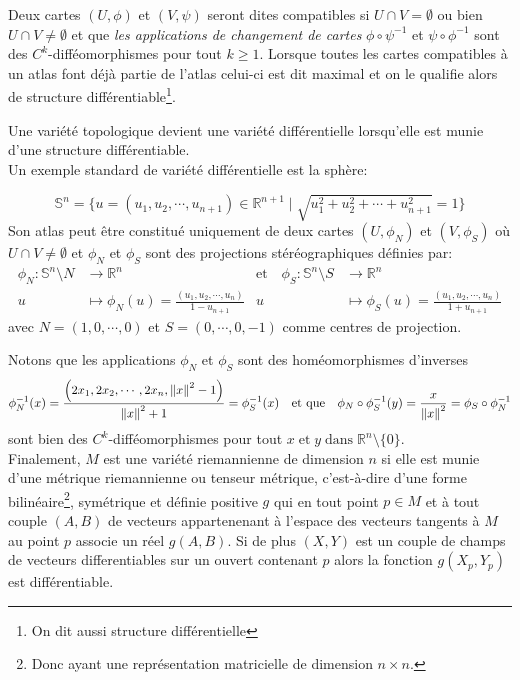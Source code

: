 \documentclass[11pt,french]{article}
\begin{document}
Deux cartes $(U, \phi)$ et $(V, \psi)$ seront dites compatibles si $U \cap V=\emptyset$ ou bien $U\cap V\neq \emptyset$ et que \textit{les applications de changement de cartes} $\phi\circ\psi^{-1}$ et $\psi\circ\phi^{-1}$ sont des $C^{k}$-difféomorphismes pour tout $k\geq 1$. Lorsque toutes les cartes compatibles à un atlas font déjà partie de l'atlas celui-ci est dit maximal et on le qualifie alors de structure différentiable\footnote{On dit aussi structure différentielle}.

Une variété topologique devient une variété différentielle lorsqu'elle est munie d'une structure différentiable. \\ 

Un exemple standard de variété différentielle est la sphère: 

\begin{equation*}
    \mathbb{S}^n=\{u=(u_1, u_2,\cdots, u_{n+1}) \in\mathbb{R}^{n+1}\mid\sqrt{u_1^2+u_2^2+\cdots+u_{n+1}^2}=1\}
\end{equation*}
Son atlas peut être constitué uniquement de deux cartes $\left(U, \phi_N \right)$ et $\left (V, \phi_S \right)$ où $U\cap V \neq \emptyset$ et $\phi_N$ et $\phi_S$ sont des projections stéréographiques définies par:
\begin{align*}
\phi_N\colon\mathbb{S}^n\setminus{N}&\longrightarrow\mathbb{R}^n &\text{et} \quad\phi_S\colon\mathbb{S}^n\setminus{S}&\longrightarrow\mathbb{R}^n\\
   u &\longmapsto\phi_N(u)=\frac{(u_1, u_2,\cdots, u_n)}{1-u_{n+1}}  &  u&\longmapsto\phi_S(u)=\frac{(u_1, u_2,\cdots, u_n)}{1+u_{n+1}}
\end{align*}
avec $N=(1, 0, \cdots, 0)$ et $S=(0, \cdots, 0, -1)$ comme centres de projection.

Notons que les applications $\phi_N$ et $\phi_S$ sont des homéomorphismes d'inverses
\begin{equation*}
\phi_N^{-1}(x)=\frac{\left (2x_1, 2x_2, \cdots, 2x_n, \norm{x}^2-1\right)}{\norm{x}^2+1}=\phi_S^{-1}(x)\quad\text{et que}\quad \phi_N\circ\phi_S^{-1}(y)=\frac{x}{\norm{x}^2}=\phi_S\circ\phi_N^{-1}   
\end{equation*}
sont bien des $C^{k}$-difféomorphismes pour tout $x\;\text{et}\;y\;\text{dans}\;\mathbb{R}^n\setminus\{0\}$.\\

Finalement,  $M$ est une variété riemannienne de dimension $n$ si elle est munie d'une métrique riemannienne ou tenseur métrique, c'est-à-dire d'une forme bilinéaire\footnote{Donc ayant une représentation matricielle de dimension $n\times n$.}, symétrique et définie positive $g$ qui en tout point $p\in M$ et à tout couple $(A, B)$ de vecteurs appartenenant à l'espace des vecteurs tangents à $M$ au point $p$ associe un réel $g(A, B)$. Si de plus $(X, Y)$ est un couple de champs de vecteurs differentiables sur un ouvert contenant $p$ alors la fonction $g(X_p, Y_p)$ est différentiable.
\end{document}
